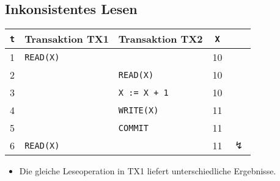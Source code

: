 		\subsection{Inkonsistentes Lesen} %
			\begin{table}[H]
				\centering
				\begin{tabular}{c | l | l | c c}
					\textbf{\texttt{t}} & \textbf{Transaktion TX1} & \textbf{Transaktion TX2} & \textbf{\texttt{X}} &                \\ \hline
					1                   & \texttt{READ(X)}         &                          & 10                  &                \\
					2                   &                          & \texttt{READ(X)}         & 10                  &                \\
					3                   &                          & \texttt{X := X + 1}      & 10                  &                \\
					4                   &                          & \texttt{WRITE(X)}        & 11                  &                \\
					5                   &                          & \texttt{COMMIT}          & 11                  &                \\
					6                   & \texttt{READ(X)}         &                          & 11                  & \(\lightning\)
				\end{tabular}
			\end{table}

			\begin{itemize}
				\item Die gleiche Leseoperation in TX1 liefert unterschiedliche Ergebnisse.
			\end{itemize}

